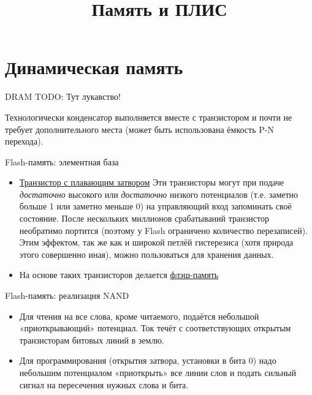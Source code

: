 \documentclass[xetex,aspectratio=43]{beamer}
\title[Память и ПЛИС]{Память и ПЛИС}
\begin{document}
    \titleslide

    \tocslide

\section{Динамическая память}

\begin{frame}{DRAM}
    \alert{TODO: Тут лукавство!}

    \begin{figure}
        
    \end{figure}

    Технологически конденсатор выполняется вместе с транзистором и почти не
    требует дополнительного места (может быть использована ёмкость P-N
    перехода).
\end{frame}


\begin{frame}{Flash-память: элементная база}
    \begin{itemize}
        \item
        \href{http://en.wikipedia.org/wiki/Floating-gate_transistor}{Транзистор
            с плавающим затвором} Эти транзисторы могут при подаче
        \emph{достаточно} высокого или \emph{достаточно} низкого потенциалов
        (т.е. заметно больше 1 или заметно меньше 0) на управляющий вход
        запоминать своё состояние. После нескольких миллионов срабатываний
        транзистор необратимо портится (поэтому у Flash ограничено количество
        перезаписей). Этим эффектом, так же как и широкой петлёй гистерезиса
        (хотя природа этого совершенно иная), можно пользоваться для хранения
        данных.
        \item
        На основе таких транзисторов делается
        \href{http://en.wikipedia.org/wiki/Flash_memory}{флэш-память}
    \end{itemize}
\end{frame}

\begin{frame}{Flash-память: реализация NAND}
    \begin{figure}
        
    \end{figure}

    \begin{itemize}
        \tightlist
        \item
        Для чтения на все слова, кроме читаемого, подаётся небольшой
        «приоткрывающий» потенциал. Ток течёт с соответствующих открытым
        транзисторам битовых линий в землю.
        \item
        Для программирования (открытия затвора, установки в бита 0) надо
        небольшим потенциалом «приоткрыть» все линии слов и подать сильный
        сигнал на пересечения нужных слова и бита.
    \end{itemize}
\end{frame}
\end{document}
